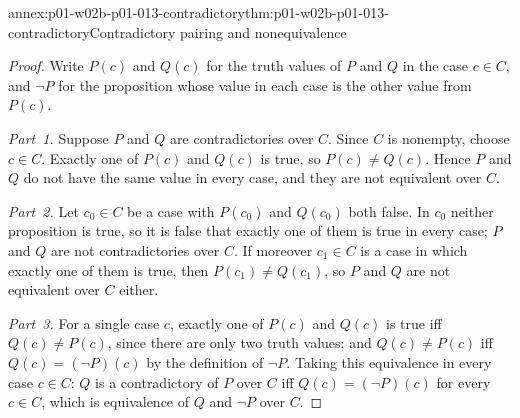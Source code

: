 \begin{annexitem}{annex:p01-w02b-p01-013-contradictory}{thm:p01-w02b-p01-013-contradictory}{Contradictory pairing and nonequivalence}
\begin{proof}
Write \(P(c)\) and \(Q(c)\) for the truth values of \(P\) and \(Q\) in the
case \(c\in C\), and \(\neg P\) for the proposition whose value in each case
is the other value from \(P(c)\).

\emph{Part~1.}  Suppose \(P\) and \(Q\) are contradictories over \(C\).
Since \(C\) is nonempty, choose \(c\in C\).  Exactly one of \(P(c)\) and
\(Q(c)\) is true, so \(P(c)\neq Q(c)\).  Hence \(P\) and \(Q\) do not have
the same value in every case, and they are not equivalent over \(C\).

\emph{Part~2.}  Let \(c_0\in C\) be a case with \(P(c_0)\) and \(Q(c_0)\)
both false.  In \(c_0\) neither proposition is true, so it is false that
exactly one of them is true in every case; \(P\) and \(Q\) are not
contradictories over \(C\).  If moreover \(c_1\in C\) is a case in which
exactly one of them is true, then \(P(c_1)\neq Q(c_1)\), so \(P\) and \(Q\)
are not equivalent over \(C\) either.

\emph{Part~3.}  For a single case \(c\), exactly one of \(P(c)\) and \(Q(c)\)
is true iff \(Q(c)\neq P(c)\), since there are only two truth values; and
\(Q(c)\neq P(c)\) iff \(Q(c)=(\neg P)(c)\) by the definition of \(\neg P\).
Taking this equivalence in every case \(c\in C\): \(Q\) is a contradictory
of \(P\) over \(C\) iff \(Q(c)=(\neg P)(c)\) for every \(c\in C\), which is
equivalence of \(Q\) and \(\neg P\) over \(C\).
\end{proof}
\end{annexitem}

